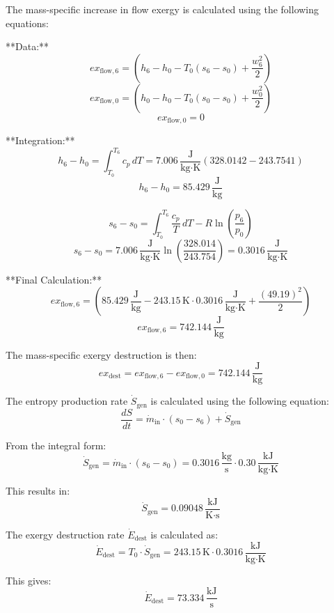 The mass-specific increase in flow exergy is calculated using the following equations:  

**Data:**  
\[
ex_{\text{flow},6} = \left( h_6 - h_0 - T_0 (s_6 - s_0) + \frac{w_6^2}{2} \right)
\]  
\[
ex_{\text{flow},0} = \left( h_0 - h_0 - T_0 (s_0 - s_0) + \frac{w_0^2}{2} \right)
\]  
\[
ex_{\text{flow},0} = 0
\]  

**Integration:**  
\[
h_6 - h_0 = \int_{T_0}^{T_6} c_p \, dT = 7.006 \, \frac{\text{J}}{\text{kg·K}} \left( 328.0142 - 243.7541 \right)
\]  
\[
h_6 - h_0 = 85.429 \, \frac{\text{J}}{\text{kg}}
\]  

\[
s_6 - s_0 = \int_{T_0}^{T_6} \frac{c_p}{T} \, dT - R \ln \left( \frac{p_6}{p_0} \right)
\]  
\[
s_6 - s_0 = 7.006 \, \frac{\text{J}}{\text{kg·K}} \ln \left( \frac{328.014}{243.754} \right) = 0.3016 \, \frac{\text{J}}{\text{kg·K}}
\]  

**Final Calculation:**  
\[
ex_{\text{flow},6} = \left( 85.429 \, \frac{\text{J}}{\text{kg}} - 243.15 \, \text{K} \cdot 0.3016 \, \frac{\text{J}}{\text{kg·K}} + \frac{(49.19)^2}{2} \right)
\]  
\[
ex_{\text{flow},6} = 742.144 \, \frac{\text{J}}{\text{kg}}
\]  

The mass-specific exergy destruction is then:  
\[
ex_{\text{dest}} = ex_{\text{flow},6} - ex_{\text{flow},0} = 742.144 \, \frac{\text{J}}{\text{kg}}
\]

The entropy production rate \( \dot{S}_{\text{gen}} \) is calculated using the following equation:
\[
\frac{dS}{dt} = \dot{m}_{\text{in}} \cdot (s_0 - s_6) + \dot{S}_{\text{gen}}
\]

From the integral form:
\[
\dot{S}_{\text{gen}} = \dot{m}_{\text{in}} \cdot (s_6 - s_0) = 0.3016 \, \frac{\text{kg}}{\text{s}} \cdot 0.30 \, \frac{\text{kJ}}{\text{kg·K}}
\]

This results in:
\[
\dot{S}_{\text{gen}} = 0.09048 \, \frac{\text{kJ}}{\text{K·s}}
\]

The exergy destruction rate \( \dot{E}_{\text{dest}} \) is calculated as:
\[
\dot{E}_{\text{dest}} = T_0 \cdot \dot{S}_{\text{gen}} = 243.15 \, \text{K} \cdot 0.3016 \, \frac{\text{kJ}}{\text{kg·K}}
\]

This gives:
\[
\dot{E}_{\text{dest}} = 73.334 \, \frac{\text{kJ}}{\text{s}}
\]